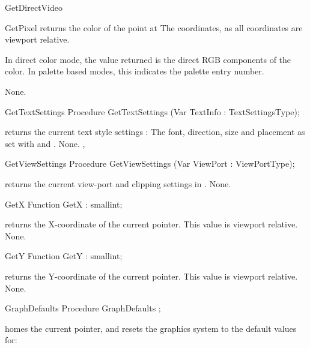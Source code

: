 \begin{function}{GetDirectVideo}
\begin{function}{GetPixel}
\Description
{} returns the color
of the point at  The coordinates, as all coordinates
are viewport relative.

In direct color mode, the value returned is the direct RGB components of
the color. In palette based modes, this indicates the palette entry number.

\Errors
None.
\SeeAlso

\end{function}
\begin{procedure}{GetTextSettings}
\Declaration
Procedure GetTextSettings (Var TextInfo : TextSettingsType);

\Description
{} returns the current text style settings : The font,
direction, size and placement as set with  and
.
\Errors
None.
\SeeAlso
{}, 

\end{procedure}
\begin{procedure}{GetViewSettings}
\Declaration
Procedure GetViewSettings (Var ViewPort : ViewPortType);

\Description
{} returns the current view-port and clipping settings in
.
\Errors
None.
\SeeAlso
{}
\end{procedure}

\begin{function}{GetX}
\Declaration
Function GetX  : smallint;

\Description
{} returns the X-coordinate of the current pointer. This value is
viewport relative.
\Errors
None.
\SeeAlso
{}
\end{function}
\begin{function}{GetY}
\Declaration
Function GetY  : smallint;

\Description
{} returns the Y-coordinate of the current pointer. This value is
viewport relative.
\Errors
None.
\SeeAlso
{}
\end{function}
\begin{procedure}{GraphDefaults}
\Declaration
Procedure GraphDefaults ;

\Description
{} homes the current pointer, and resets the graphics
system to the default values for:


\end{procedure}
\end{function}
